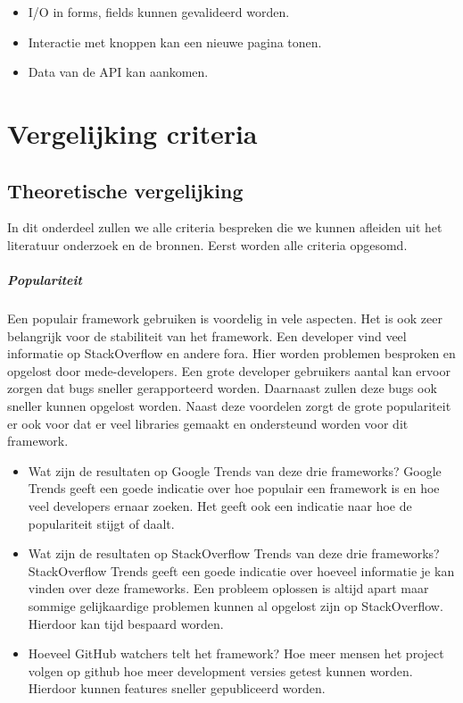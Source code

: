 \begin{itemize}
	\item I/O in forms, fields kunnen gevalideerd worden.
	\item Interactie met knoppen kan een nieuwe pagina tonen.
	\item Data van de API kan aankomen.
\end{itemize}

\section{Vergelijking criteria}
\label{sec:Vergelijking_Criteria}

\subsection{Theoretische vergelijking}
\label{sec:Theoretische_Vergelijking}
In dit onderdeel zullen we alle criteria bespreken die we kunnen afleiden uit het literatuur onderzoek en de bronnen. Eerst worden alle criteria opgesomd.

\subparagraph{Populariteit}
Een populair framework gebruiken is voordelig in vele aspecten. Het is ook zeer belangrijk voor de stabiliteit van het framework. Een developer vind veel informatie op StackOverflow en andere fora. Hier worden problemen besproken en opgelost door mede-developers. Een grote developer gebruikers aantal kan ervoor zorgen dat bugs sneller gerapporteerd worden. Daarnaast zullen deze bugs ook sneller kunnen opgelost worden. Naast deze voordelen zorgt de grote populariteit er ook voor dat er veel libraries gemaakt en ondersteund worden voor dit framework.

\begin{itemize}
	\item Wat zijn de resultaten op Google Trends van deze drie frameworks? Google Trends geeft een goede indicatie over hoe populair een framework is en hoe veel developers ernaar zoeken. Het geeft ook een indicatie naar hoe de populariteit stijgt of daalt.
	\item Wat zijn de resultaten op StackOverflow Trends van deze drie frameworks? StackOverflow Trends geeft een goede indicatie over hoeveel informatie je kan vinden over deze frameworks. Een probleem oplossen is altijd apart maar sommige gelijkaardige problemen kunnen al opgelost zijn op StackOverflow. Hierdoor kan tijd bespaard worden.
	\item Hoeveel GitHub watchers telt het framework? Hoe meer mensen het project volgen op github hoe meer development versies getest kunnen worden. Hierdoor kunnen features sneller gepubliceerd worden.
\end{itemize}

